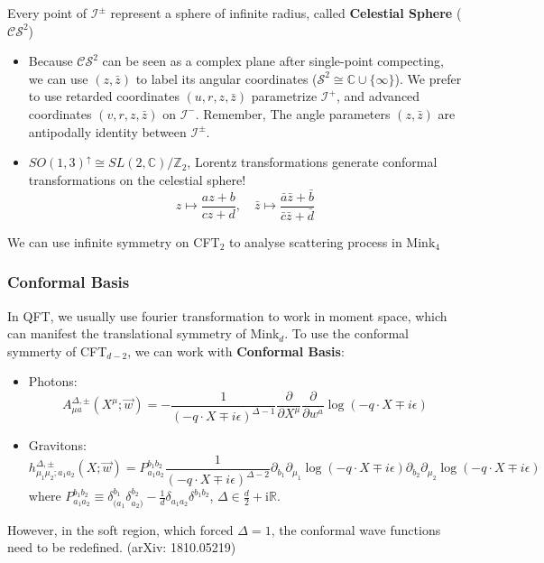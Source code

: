 \documentclass[aspectratio=169]{beamer}%
\begin{document}
	\begin{frame}
		\begin{definition}
			Every point of $\mathcal{I}^{\pm}$ represent a sphere of infinite radius, called \textbf{Celestial Sphere} ($\mathcal{CS}^2$)
		\end{definition}
		\begin{itemize}
		\item Because $\mathcal{CS}^2$ can be seen as a complex plane after single-point compecting, we can use $(z,\bar z)$ to label its angular coordinates ($\mathcal{S}^2\cong\mathbb{C}\cup \{\infty\}$). We prefer to use retarded coordinates $(u,r,z,\bar z)$ parametrize $\mathcal{I}^+$, and advanced coordinates $(v,r,z,\bar z)$ on $\mathcal{I}^-$. Remember, The angle parameters $(z,\bar z)$ are antipodally identity between $\mathcal{I}^\pm$.
		\item $SO(1,3)^\uparrow\cong SL(2,\mathbb{C})/\mathbb{Z}_2$, Lorentz transformations generate conformal transformations on the celestial sphere!
		\begin{equation}
			z\mapsto \frac{az+b}{cz+d},\quad \bar z\mapsto \frac{\bar a\bar z+\bar b}{\bar c\bar z+\bar d}
		\end{equation}
		\end{itemize}
		We can use infinite symmetry on CFT$_2$ to analyse scattering process in Mink$_4$
	\end{frame}
	\begin{frame}
		\frametitle{Conformal Basis}
		In QFT, we usually use fourier transformation to work in moment space, which can manifest the translational symmetry of Mink$_{d}$. To use the conformal symmerty of CFT$_{d-2}$, we can work with \textbf{Conformal Basis}:
		\begin{itemize}
			\item Photons:
			\begin{equation}
				A_{\mu a}^{\Delta,\pm}(X^{\mu};\vec{w})=-\frac1{(-q\cdot X\mp i\epsilon)^{\Delta-1}}\frac\partial{\partial X^{\mu}}\frac\partial{\partial w^a}\log(-q\cdot X\mp i\epsilon)
			\end{equation}
			\item Gravitons:
			\begin{equation}
				h_{\mu_1\mu_2;a_1a_2}^{\Delta,\pm}(X;\vec{w})=P_{a_{1}a_{2}}^{b_{1}b_{2}}\frac{1}{(-q\cdot X\mp i\epsilon)^{\Delta-2}}\partial_{b_{1}}\partial_{\mu_{1}}\log(-q\cdot X\mp i\epsilon)\partial_{b_{2}}\partial_{\mu_{2}}\log(-q\cdot X\mp i\epsilon)
			\end{equation}
			where $P_{a_1a_2}^{b_1b_2}\equiv\delta_{(a_1}^{b_1}\delta_{a_2)}^{b_2}-\frac{1}{d}\delta_{a_1a_2}\delta^{b_1b_2}$, $\Delta\in\frac d2+\text{i}\mathbb{R}$.
		\end{itemize}
		However, in the soft region, which forced $\Delta=1$, the conformal wave functions need to be redefined. (arXiv: 1810.05219)
	\end{frame}
\end{document}
